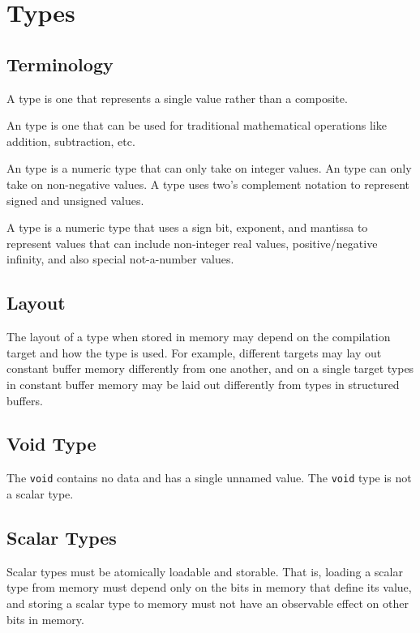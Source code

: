 \chapter{Types}

\section{Terminology}

A  type is one that represents a single value rather than a composite.

An  type is one that can be used for traditional mathematical operations like addition, subtraction, etc.

An  type is a numeric type that can only take on integer values.
An  type can only take on non-negative values.
A  type uses two's complement notation to represent signed and unsigned values.

A  type is a numeric type that uses a sign bit, exponent, and mantissa to represent values that can include non-integer real values, positive/negative infinity, and also special not-a-number values.

\section{Layout}

The layout of a type when stored in memory may depend on the compilation target and how the type is used.
For example, different targets may lay out constant buffer memory differently from one another, and on a single target types in constant buffer memory may be laid out differently from types in structured buffers.

\section{Void Type}

The \lstinline|void| contains no data and has a single unnamed value.
The \lstinline|void| type is not a scalar type.

\section{Scalar Types}
\label{sec:scalar-types}

Scalar types must be atomically loadable and storable.
That is, loading a scalar type from memory must depend only on the bits in memory that define its value, and storing a scalar type to memory must not have an observable effect on other bits in memory.


